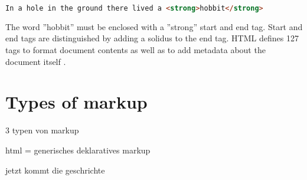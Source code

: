 \begin{lstlisting}[language=html, caption=Text formatted as bold with the ''strong'' tag, label=lst:html_markup_bold_example]
In a hole in the ground there lived a <strong>hobbit</strong>
\end{lstlisting}

The word ''hobbit'' must be enclosed with a ''strong'' start and end tag. Start and end tags are distinguished by adding a solidus to the end tag. HTML defines 127 tags to format document contents as well as to add metadata about the document itself \cite{mozel}.%

\section{Types of markup}

3 typen von markup

html = generisches deklaratives markup

jetzt kommt die geschrichte




